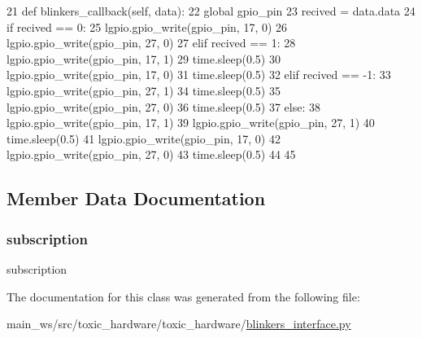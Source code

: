 \begin{DoxyCode}
21     \textcolor{keyword}{def }blinkers\_callback(self, data):
22         \textcolor{keyword}{global} gpio\_pin
23         recived = data.data
24         \textcolor{keywordflow}{if} recived == 0:
25             lgpio.gpio\_write(gpio\_pin, 17, 0)
26             lgpio.gpio\_write(gpio\_pin, 27, 0)
27         \textcolor{keywordflow}{elif} recived == 1:
28             lgpio.gpio\_write(gpio\_pin, 17, 1)
29             time.sleep(0.5)
30             lgpio.gpio\_write(gpio\_pin, 17, 0)
31             time.sleep(0.5)
32         \textcolor{keywordflow}{elif} recived == -1:
33             lgpio.gpio\_write(gpio\_pin, 27, 1)
34             time.sleep(0.5)
35             lgpio.gpio\_write(gpio\_pin, 27, 0)
36             time.sleep(0.5)
37         \textcolor{keywordflow}{else}:
38             lgpio.gpio\_write(gpio\_pin, 17, 1)
39             lgpio.gpio\_write(gpio\_pin, 27, 1)
40             time.sleep(0.5)
41             lgpio.gpio\_write(gpio\_pin, 17, 0)
42             lgpio.gpio\_write(gpio\_pin, 27, 0)
43             time.sleep(0.5)
44 
45 
\end{DoxyCode}


\subsection{Member Data Documentation}
\mbox{\label{classtoxic__hardware_1_1blinkers__interface_1_1BlinkersInterface_a4b0698733c4dfaffe8e2b4cd952b6f82}} 
\subsubsection{\texorpdfstring{subscription}{subscription}}
{\footnotesize\ttfamily subscription}



The documentation for this class was generated from the following file\+:\begin{DoxyCompactItemize}
\item 
main\+\_\+ws/src/toxic\+\_\+hardware/toxic\+\_\+hardware/\mbox{\hyperlink{blinkers__interface_8py}{blinkers\+\_\+interface.\+py}}\end{DoxyCompactItemize}
